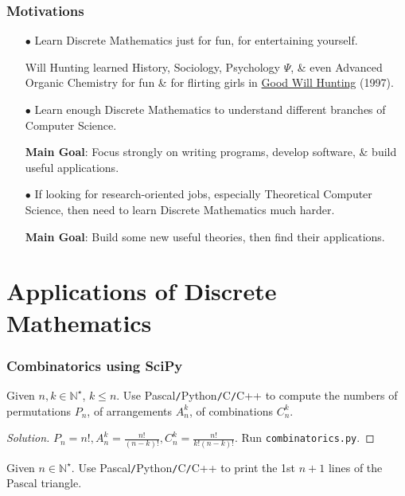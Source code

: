 \documentclass{beamer}
\begin{document}
\begin{frame}
	\frametitle{Motivations}
	\begin{itemize}
		\item[$\bullet$] Learn Discrete Mathematics just for fun, for entertaining yourself.
		
		\begin{example}
			{\sf Will Hunting} learned History, Sociology, Psychology $\Psi$, \& even Advanced Organic Chemistry for fun \& for flirting girls in \href{https://www.imdb.com/title/tt0119217}{Good Will Hunting} (1997).
		\end{example}
		
		\item[$\bullet$] Learn enough Discrete Mathematics to understand different branches of Computer Science.
		
		{\bf Main Goal}: Focus strongly on writing programs, develop software, \& build useful applications.
		\item[$\bullet$] If looking for research-oriented jobs, especially Theoretical Computer Science, then need to learn Discrete Mathematics much harder.
		
		{\bf Main Goal}: Build some new useful theories, then find their applications.
	\end{itemize}
	
	
	
\end{frame}

\section{Applications of Discrete Mathematics}

\begin{frame}
	\frametitle{Combinatorics using SciPy}
	\begin{problem}
		Given $n,k\in\mathbb{N}^\star$, $k\le n$. Use {\sf Pascal{\tt/}Python{\tt/}C{\tt/}C++} to compute the numbers of permutations $P_n$, of arrangements $A_n^k$, of combinations $C_n^k$.
	\end{problem}
	
	\begin{proof}[Solution]
		$P_n = n!,A_n^k = \frac{n!}{(n - k)!},C_n^k = \frac{n!}{k!(n - k)!}$. Run {\tt combinatorics.py}.		
	\end{proof}
	
	\begin{problem}
		Given $n\in\mathbb{N}^\star$. Use {\sf Pascal{\tt/}Python{\tt/}C{\tt/}C++} to print the 1st $n + 1$ lines of the Pascal triangle.
	\end{problem}
\end{frame}
\end{document}
